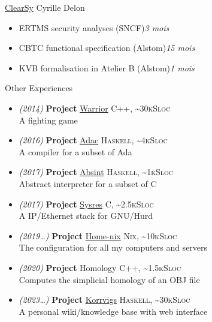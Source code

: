 \documentclass[a4paper,11pt]{extarticle}
\newcommand{\cvtitle}[1]{
    \begin{tcolorbox}[colback=sidebg,colframe=sidefg,coltext=sidetext,
        height=1cm, valign=center, sharp corners=downhill]
        {\large #1}
    \end{tcolorbox}
}
\newcommand{\lang}[2]{\hfill \textsc{\scriptsize #1, \textasciitilde#2Sloc}}
\newcommand{\director}[1]{\hfill {\scriptsize #1}}
\begin{document}
\begin{minipage}[c][282mm][t]{0.60\linewidth}
{\begin{itemize}
                \href{https://www.clearsy.com/}{ClearSy}
                \director{Cyrille Delon}\\
                \vspace{-7.5mm}\begin{itemize}
                  \item \small ERTMS security analyses (SNCF)\hfill\emph{3 mois}
                  \item \small CBTC functional specification (Alstom)\hfill\emph{15 mois}
                  \item \small KVB formalisation in Atelier B (Alstom)\hfill\emph{1 mois}
                \end{itemize}
        \end{itemize}

        \vspace{-5mm}
        \cvtitle{Other Experiences}

        \begin{itemize}
          \itemsep0em
          \item \emph{\small (2014)} \textbf{Project} \href{https://github.com/DWARVES/Project-Warrior}{Warrior}
                \lang{C++}{30k}\\
                A fighting game
          \item \emph{\small (2016)} \textbf{Project} \href{https://github.com/TWal/ENS\_Adac}{Adac}
                \lang{Haskell}{4k}\\
                A compiler for a subset of Ada
          \item \emph{\small (2017)} \textbf{Project} \href{https://github.com/dwarfmaster/absint}{Absint}
                \lang{Haskell}{1k}\\
                Abstract interpreter for a subset of C
          \item \emph{\small (2017)} \textbf{Project} \href{https://github.com/dwarfmaster/ENS_sysres}{Sysres}
                \lang{C}{2.5k}\\
                A IP/Ethernet stack for GNU/Hurd
          \item \emph{\small (2019\dots)} \textbf{Project} \href{https://github.com/dwarfmaster/home-nix}{Home-nix}
                \lang{Nix}{10k}\\
                The configuration for all my computers and servers
          \item \emph{\small (2020)} \textbf{Project} Homology
                \lang{C++}{1.5k}\\
                Computes the simplicial homology of an OBJ file
          \item \emph{\small (2023\dots)} \textbf{Project} \href{https://github.com/dwarfmaster/korrvigs}{Korrvigs}
                \lang{Haskell}{30k}\\
                A personal wiki/knowledge base with web interface
        \end{itemize}

      }
    \end{minipage}
\end{document}
